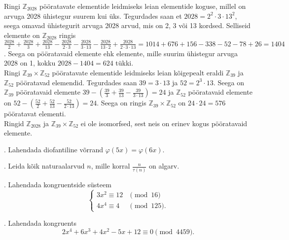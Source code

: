 \documentclass[a4paper, 10pt]{article}
\newcommand{\Z}{\mathbb{Z}}
\begin{document}
\bigskip
Ringi $\Z_{2028}$ pööratavate elementide leidmiseks leian elementide koguse, millel on arvuga 2028 ühistegur suurem kui üks. Tegurdades saan et $2028=2^2\cdot3\cdot13^2$, seega omavad ühistegurit arvuga 2028 arvud, mis on 2, 3 või 13 kordsed. Selliseid elemente on $\Z_{2028}$ ringis $\frac{2028}{2}+\frac{2028}{3}+\frac{2028}{13}-\frac{2028}{2\cdot3}-\frac{2028}{3\cdot13}-\frac{2028}{13\cdot2}+\frac{2028}{2\cdot3\cdot13}=1014+676+156-338-52-78+26=1404$. Seega on pööratavaid elemente ehk elemente, mille suurim ühistegur arvuga 2028 on 1, kokku $2028-1404=624$ tükki.\\
Ringi $\Z_{39}\times\Z_{52}$ pööratavate elementide leidmiseks leian kõigepealt eraldi $\Z_{39}$ ja $\Z_{52}$ pööratavad elemendid. Tegurdades saan $39=3\cdot13$ ja $52=2^3\cdot13$. Seega on $\Z_{39}$ pööratavaid elemente $39-\left(\frac{39}{3}+\frac{39}{13}-\frac{39}{3\cdot13}\right)=24$ ja $\Z_{52}$ pööratavaid elemente on $52-\left(\frac{52}{2}+\frac{52}{13}-\frac{52}{2\cdot13}\right)=24$. Seega on ringis $\Z_{39}\times\Z_{52}$ on $24\cdot24=576$ pööratavat elementi.\\
Ringid $\Z_{2028}$ ja $\Z_{39}\times\Z_{52}$ ei ole isomorfsed, sest neis on erinev kogus pööratavaid elemente.
\bigskip

. Lahendada diofantiline võrrand $\varphi(5x) = \varphi(6x)$.


\bigskip

. Leida kõik naturaalarvud $n$, mille korral $\frac{n}{\tau(n)}$ on algarv. 

\bigskip

. Lahendada kongruentside s\"usteem 
\[
\left\{
\begin{array}{ll}
3x^2\equiv 12 & \pmod{16}\\
4x^4\equiv 4 & \pmod{125}.
\end{array}
\right.
\]

\bigskip

. Lahendada kongruents $$2x^4+6x^3+4x^2-5x+12\equiv 0 \pmod{4459}.$$ 
\end{document}
